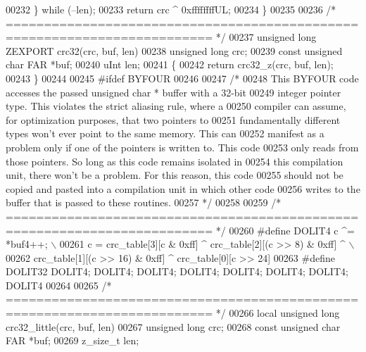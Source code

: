 \begin{DoxyCode}
{00232     \} \textcolor{keywordflow}{while} (--len);
00233     \textcolor{keywordflow}{return} crc ^ 0xffffffffUL;
00234 \}
00235 
00236 \textcolor{comment}{/* ========================================================================= */}
00237 \textcolor{keywordtype}{unsigned} \textcolor{keywordtype}{long} ZEXPORT crc32(crc, buf, len)
00238     \textcolor{keywordtype}{unsigned} \textcolor{keywordtype}{long} crc;
00239     \textcolor{keyword}{const} \textcolor{keywordtype}{unsigned} \textcolor{keywordtype}{char} FAR *buf;
00240     uInt len;
00241 \{
00242     \textcolor{keywordflow}{return} crc32\_z(crc, buf, len);
00243 \}
00244 
00245 \textcolor{preprocessor}{#ifdef BYFOUR}
00246 
00247 \textcolor{comment}{/*}
00248 \textcolor{comment}{   This BYFOUR code accesses the passed unsigned char * buffer with a 32-bit}
00249 \textcolor{comment}{   integer pointer type. This violates the strict aliasing rule, where a}
00250 \textcolor{comment}{   compiler can assume, for optimization purposes, that two pointers to}
00251 \textcolor{comment}{   fundamentally different types won't ever point to the same memory. This can}
00252 \textcolor{comment}{   manifest as a problem only if one of the pointers is written to. This code}
00253 \textcolor{comment}{   only reads from those pointers. So long as this code remains isolated in}
00254 \textcolor{comment}{   this compilation unit, there won't be a problem. For this reason, this code}
00255 \textcolor{comment}{   should not be copied and pasted into a compilation unit in which other code}
00256 \textcolor{comment}{   writes to the buffer that is passed to these routines.}
00257 \textcolor{comment}{ */}
00258 
00259 \textcolor{comment}{/* ========================================================================= */}
00260 \textcolor{preprocessor}{#define DOLIT4 c ^= *buf4++; \(\backslash\)}
00261 \textcolor{preprocessor}{        c = crc\_table[3][c & 0xff] ^ crc\_table[2][(c >> 8) & 0xff] ^ \(\backslash\)}
00262 \textcolor{preprocessor}{            crc\_table[1][(c >> 16) & 0xff] ^ crc\_table[0][c >> 24]}
00263 \textcolor{preprocessor}{#define DOLIT32 DOLIT4; DOLIT4; DOLIT4; DOLIT4; DOLIT4; DOLIT4; DOLIT4; DOLIT4}
00264 
00265 \textcolor{comment}{/* ========================================================================= */}
00266 local \textcolor{keywordtype}{unsigned} \textcolor{keywordtype}{long} crc32\_little(crc, buf, len)
00267     \textcolor{keywordtype}{unsigned} \textcolor{keywordtype}{long} crc;
00268     \textcolor{keyword}{const} \textcolor{keywordtype}{unsigned} \textcolor{keywordtype}{char} FAR *buf;
00269     z\_size\_t len;
}
\end{DoxyCode}
